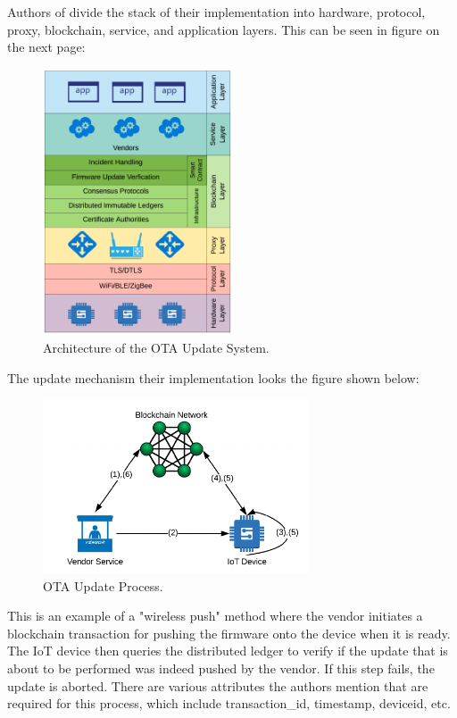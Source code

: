 \documentclass{article}
\begin{document}
Authors of \cite{otaupdate} divide the stack of their implementation into hardware, protocol, proxy, blockchain, service, and application layers. This can be seen in figure on the next page:
\begin{figure}[H]
    \centering
    \includegraphics[width=0.5\textwidth]{ota01.png}
    \caption{Architecture of the OTA Update System.\cite{otaupdate}}
\end{figure}


The update mechanism their implementation looks the figure shown below:
\begin{figure}[H]
    \centering
    \includegraphics[width=0.7\textwidth]{ota02.png}
    \caption{OTA Update Process.\cite{otaupdate}}
\end{figure}


This is an example of a "wireless push" method where the vendor initiates a blockchain transaction for pushing the firmware onto the device when it is ready. The IoT device then queries the distributed ledger to verify if the update that is about to be performed was indeed pushed by the vendor. If this step fails, the update is aborted. There are various attributes the authors mention that are required for this process, which include transaction\_id, timestamp, deviceid, etc.
\end{document}
